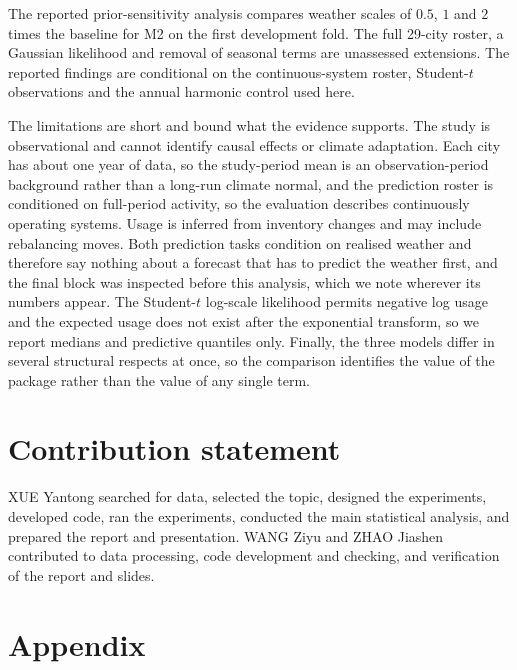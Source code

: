 \documentclass{article}
\begin{document}
The reported prior-sensitivity analysis compares weather scales of $0.5$, $1$ and $2$ times the
baseline for M2 on the first development fold. The full 29-city roster, a Gaussian likelihood and
removal of seasonal terms are unassessed extensions. The reported findings are conditional on the
continuous-system roster, Student-$t$ observations and the annual harmonic control used here.

The limitations are short and bound what the evidence supports. The study is observational and
cannot identify causal effects or climate adaptation. Each city has about one year of data, so the
study-period mean is an observation-period background rather than a long-run climate normal, and the
prediction roster is conditioned on full-period activity, so the evaluation describes continuously
operating systems. Usage is inferred from inventory changes and may include rebalancing moves. Both
prediction tasks condition on realised weather and therefore say nothing about a forecast that has to
predict the weather first, and the final block was inspected before this analysis, which we note
wherever its numbers appear. The Student-$t$ log-scale likelihood permits negative log usage and the
expected usage does not exist after the exponential transform, so we report medians and predictive
quantiles only. Finally, the three models differ in several structural respects at once, so the
comparison identifies the value of the package rather than the value of any single term.

\section*{Contribution statement}

XUE Yantong searched for data, selected the topic, designed the experiments, developed code,
ran the experiments, conducted the main statistical analysis, and prepared the report and presentation.
WANG Ziyu and ZHAO Jiashen contributed to data processing, code development and
checking, and verification of the report and slides.




\newpage
\appendix
\section{Appendix}
\end{document}

